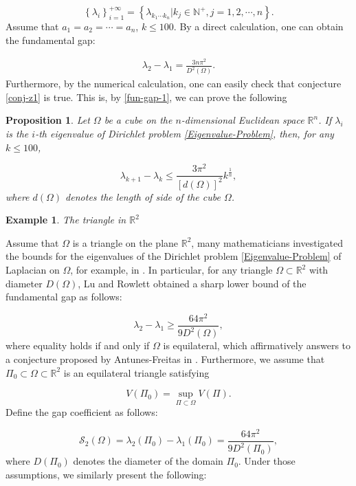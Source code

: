 \documentclass[12pt]{article}
\newtheorem{exa}{Example}[section]
\newtheorem{prop}[thm]{Proposition}
\numberwithin{equation}{section}
\begin{document}
$$\left\{\lambda_{i}\right\}_{i=1}^{+\infty}=\left\{\lambda_{k_{1}\cdots k_{n}}|k_{j}\in\mathbb{N}^{+},j=1,2,\cdots,n\right\}.$$
Assume  that $a_{1}=a_{2}=\cdots=a_{n}$, $k\leq100$. By a direct calculation, one can obtain the fundamental gap:

\begin{equation}\begin{aligned}\label{fun-gap-1}  \lambda_{2}-\lambda_{1}
=\frac{3n\pi^{2}}{D^{2}(\Omega)}.\end{aligned}\end{equation}Furthermore, by the numerical calculation, one can easily check that conjecture \ref{conj-z1} is true.
This is, by  \eqref{fun-gap-1}, we can prove the following

\begin{prop}\label{prop1}
Let $\Omega$ be a cube on the $n$-dimensional Euclidean space
$\mathbb{R}^{n}$. If $\lambda_{i}$ is the $i$-th eigenvalue of Dirichlet problem \eqref{Eigenvalue-Problem}, then, for any $k\leq100$,

\begin{equation}\lambda_{k+1}-\lambda_{k}\leq \frac{3\pi^{2}}{[d(\Omega)]^{2}}k^{\frac{1}{n}},
\end{equation}
where $d(\Omega)$ denotes the length of side of the cube $\Omega$.

\end{prop}

\begin{exa}The triangle in $\mathbb{R}^{2}$
\end{exa}
Assume that $\Omega$ is a  triangle on the plane $\mathbb{R}^{2}$, many mathematicians investigated the bounds for the eigenvalues of the Dirichlet problem \eqref{Eigenvalue-Problem} of Laplacian on $\Omega$, for example, in \cite{FS,He,LR,M,PS,Siu1,Siu2}. In particular,
for any triangle $\Omega\subset\mathbb{R}^{2}$ with diameter $D(\Omega)$,  Lu and  Rowlett \cite{LR} obtained a sharp lower bound of the fundamental gap as follows:

$$\lambda_{2}-\lambda_{1}\geq \frac{64\pi^{2}}{9D^{2}(\Omega)},$$
where equality holds if and only if $\Omega$ is equilateral, which affirmatively answers to a conjecture proposed by  Antunes-Freitas in \cite{AF}.
Furthermore, we assume that $\Pi_{0}\subset\Omega\subset\mathbb{R}^{2}$ is an equilateral triangle satisfying

$$V(\Pi_{0})=\sup_{\Pi\subset\Omega}V(\Pi).$$ Define the gap coefficient as follows:

\begin{equation*}\mathcal{S}_{2}(\Omega)=\lambda_{2}(\Pi_{0})-\lambda_{1}(\Pi_{0})=
\frac{64\pi^{2}}{9D^{2}(\Pi_{0})},
                          \end{equation*}where $D(\Pi_{0})$ denotes the diameter of the domain $\Pi_{0}$. Under those assumptions, we similarly present the following:
\end{document}

